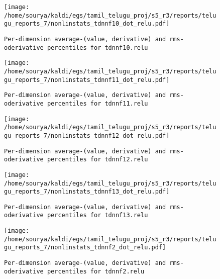 \documentclass[prl,10pt,twocolumn]{revtex4}
\begin{document}
\newpage
\begin{figure}[h]
  \begin{center}
    \caption{\texttt{Per-dimension average-(value, derivative) and rms-oderivative percentiles for tdnnf10.relu}}
    \texttt{[image: /home/sourya/kaldi/egs/tamil\_telugu\_proj/s5\_r3/reports/telugu\_reports\_7/nonlinstats\_tdnnf10\_dot\_relu.pdf]}
  \end{center}
\end{figure}
\clearpage


\newpage
\begin{figure}[h]
  \begin{center}
    \caption{\texttt{Per-dimension average-(value, derivative) and rms-oderivative percentiles for tdnnf11.relu}}
    \texttt{[image: /home/sourya/kaldi/egs/tamil\_telugu\_proj/s5\_r3/reports/telugu\_reports\_7/nonlinstats\_tdnnf11\_dot\_relu.pdf]}
  \end{center}
\end{figure}
\clearpage


\newpage
\begin{figure}[h]
  \begin{center}
    \caption{\texttt{Per-dimension average-(value, derivative) and rms-oderivative percentiles for tdnnf12.relu}}
    \texttt{[image: /home/sourya/kaldi/egs/tamil\_telugu\_proj/s5\_r3/reports/telugu\_reports\_7/nonlinstats\_tdnnf12\_dot\_relu.pdf]}
  \end{center}
\end{figure}
\clearpage


\newpage
\begin{figure}[h]
  \begin{center}
    \caption{\texttt{Per-dimension average-(value, derivative) and rms-oderivative percentiles for tdnnf13.relu}}
    \texttt{[image: /home/sourya/kaldi/egs/tamil\_telugu\_proj/s5\_r3/reports/telugu\_reports\_7/nonlinstats\_tdnnf13\_dot\_relu.pdf]}
  \end{center}
\end{figure}
\clearpage


\newpage
\begin{figure}[h]
  \begin{center}
    \caption{\texttt{Per-dimension average-(value, derivative) and rms-oderivative percentiles for tdnnf2.relu}}
    \texttt{[image: /home/sourya/kaldi/egs/tamil\_telugu\_proj/s5\_r3/reports/telugu\_reports\_7/nonlinstats\_tdnnf2\_dot\_relu.pdf]}
  \end{center}
\end{figure}
\clearpage
\end{document}
